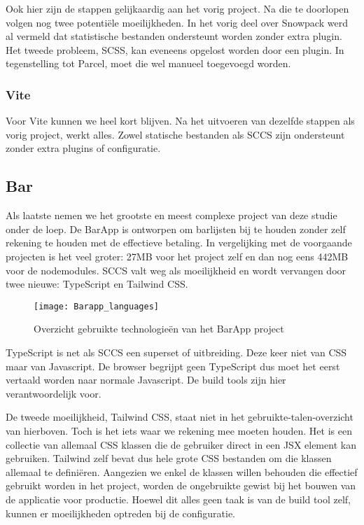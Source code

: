Ook hier zijn de stappen gelijkaardig aan het vorig project. Na die te doorlopen volgen nog twee potentiële moeilijkheden. In het vorig deel over Snowpack werd al vermeld dat statistische bestanden ondersteunt worden zonder extra plugin. Het tweede probleem, SCSS, kan eveneens opgelost worden door een plugin. In tegenstelling tot Parcel, moet die wel manueel toegevoegd worden. 

\subsubsection{Vite}

Voor Vite kunnen we heel kort blijven. Na het uitvoeren van dezelfde stappen als vorig project, werkt alles. Zowel statische bestanden als SCCS zijn ondersteunt zonder extra plugins of configuratie.

\subsection{Bar}
Als laatste nemen we het grootste en meest complexe project van deze studie onder de loep. De BarApp \autocite{vansteenkiste-2021} is ontworpen om barlijsten bij te houden zonder zelf rekening te houden met de effectieve betaling. In vergelijking met de voorgaande projecten is het veel groter: 27MB voor het project zelf en dan nog eens 442MB voor de nodemodules. SCCS valt weg als moeilijkheid en wordt vervangen door twee nieuwe: TypeScript en Tailwind CSS.

\begin{figure}[h]
    \texttt{[image: Barapp\_languages]}
        \centering
        \caption[]{Overzicht gebruikte technologieën van het BarApp project}
    \end{figure}

    TypeScript is net als SCCS een superset of uitbreiding. Deze keer niet van CSS maar van Javascript. De browser begrijpt geen TypeScript dus moet het eerst vertaald worden naar normale Javascript. De build tools zijn hier verantwoordelijk voor.

    De tweede moeilijkheid, Tailwind CSS, staat niet in het gebruikte-talen-overzicht van hierboven. Toch is het iets waar we rekening mee moeten houden. Het is een collectie van allemaal CSS klassen die de gebruiker direct in een JSX element kan gebruiken. Tailwind zelf bevat dus hele grote CSS bestanden om die klassen allemaal te definiëren. Aangezien we enkel de klassen willen behouden die effectief gebruikt worden in het project, worden de ongebruikte gewist bij het bouwen van de applicatie voor productie. Hoewel dit alles geen taak is van de build tool zelf, kunnen er moeilijkheden optreden bij de configuratie.
    
